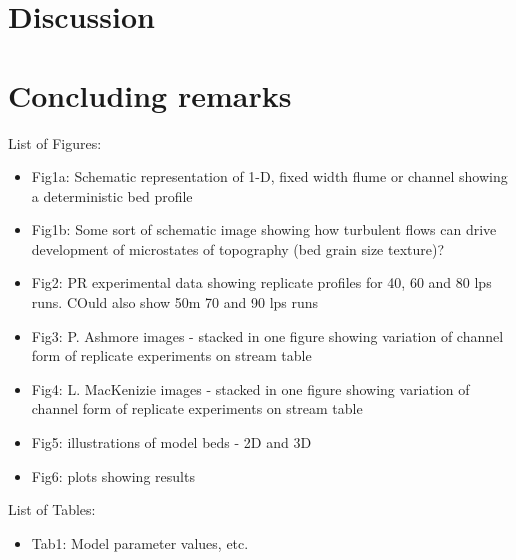 \documentclass[12pt]{article}
\begin{document}
\section{Discussion}
\section{Concluding remarks}
\pagebreak
List of Figures:
\begin{itemize}
\item{Fig1a: Schematic representation of 1-D, fixed width flume or channel showing a deterministic bed profile}
\item {Fig1b: Some sort of schematic image showing how turbulent flows can drive development of microstates of topography (bed grain size texture)?}
\item {Fig2: PR experimental data showing replicate profiles for 40, 60 and 80 lps runs. COuld also show 50m 70 and 90 lps runs}
\item {Fig3: P. Ashmore images - stacked in one figure showing variation of channel form of replicate experiments on stream table}
\item {Fig4: L. MacKenizie images - stacked in one figure showing variation of channel form of replicate experiments on stream table}
\item {Fig5: illustrations of model beds - 2D and 3D}
\item {Fig6: plots showing results}
\end{itemize}
List of Tables:
\begin{itemize}
\item {Tab1: Model parameter values, etc.}
\end{itemize}
\pagebreak
%
%
\end{document}
